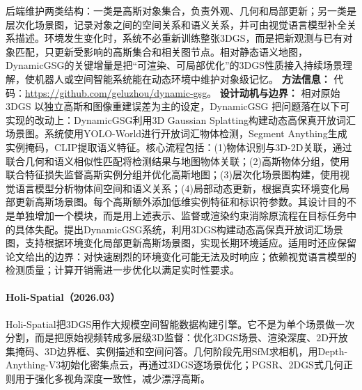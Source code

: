 后端维护两类结构：一类是高斯对象集合，负责外观、几何和局部更新；另一类是层次化场景图，记录对象之间的空间关系和语义关系，并可由视觉语言模型补全关系描述。环境发生变化时，系统不必重新训练整张3DGS，而是把新观测与已有对象匹配，只更新受影响的高斯集合和相关图节点。相对静态语义地图，DynamicGSG的关键增量是把“可渲染、可局部优化”的3DGS性质接入持续场景理解，使机器人或空间智能系统能在动态环境中维护对象级记忆。
\textbf{方法信息：} 代码：\url{https://github.com/geluzhou/dynamic-gsg}。
\textbf{设计动机与边界：} 相对原始 3DGS 以独立高斯和图像重建误差为主的设定，DynamicGSG 把问题落在以下可实现的改动上：DynamicGSG利用3D Gaussian Splatting构建动态高保真开放词汇场景图。系统使用YOLO-World进行开放词汇物体检测，Segment Anything生成实例掩码，CLIP提取语义特征。核心流程包括：(1)物体识别与3D-2D关联，通过联合几何和语义相似性匹配将检测结果与地图物体关联；(2)高斯物体分组，使用联合特征损失监督高斯实例分组并优化高斯地图；(3)层次化场景图构建，使用视觉语言模型分析物体间空间和语义关系；(4)局部动态更新，根据真实环境变化局部更新高斯场景图。每个高斯额外添加低维实例特征和标识符参数。其设计目的不是单独增加一个模块，而是用上述表示、监督或渲染约束消除原流程在目标任务中的具体失配。提出DynamicGSG系统，利用3DGS构建动态高保真开放词汇场景图，支持根据环境变化局部更新高斯场景图，实现长期环境适应。适用时还应保留论文给出的边界：对快速剧烈的环境变化可能无法及时响应；依赖视觉语言模型的检测质量；计算开销需进一步优化以满足实时性要求。
\paragraph{Holi-Spatial（2026.03）\cite{2603_07660}}
Holi-Spatial把3DGS用作大规模空间智能数据构建引擎。它不是为单个场景做一次分割，而是把原始视频转成多层级3D监督：优化3DGS场景、渲染深度、2D开放集掩码、3D边界框、实例描述和空间问答。几何阶段先用SfM求相机，用Depth-Anything-V3初始化密集点云，再通过3DGS逐场景优化；PGSR、2DGS式几何正则用于强化多视角深度一致性，减少漂浮高斯。

